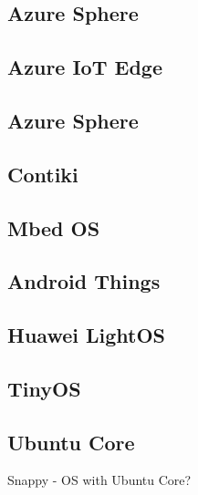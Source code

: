 \subsection{Azure Sphere}

\cite{OS_questions}



\subsection{Azure IoT Edge}

\cite{OS_questions}



\subsection{Azure Sphere}

\cite{OS_questions}



\subsection{Contiki}



\subsection{Mbed OS}



\subsection{Android Things}



\subsection{Huawei LightOS}



\subsection{TinyOS}



\subsection{Ubuntu Core}

Snappy - OS with Ubuntu Core?



